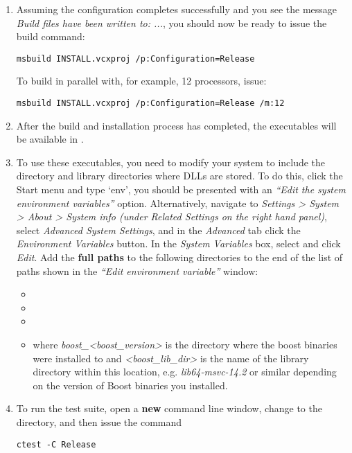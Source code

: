 \begin{enumerate}
  \item Assuming the configuration completes successfully and you see the message \emph{Build files have been written to: ...}, you should now be ready to issue the build command:
  \begin{lstlisting}[style=BashInputStyle]
    msbuild INSTALL.vcxproj /p:Configuration=Release
  \end{lstlisting}
  To build in parallel with, for example, 12 processors, issue:
  \begin{lstlisting}[style=BashInputStyle]
    msbuild INSTALL.vcxproj /p:Configuration=Release /m:12
  \end{lstlisting}
  \item After the build and installation process has completed, the executables will be
  available in .
  \item To use these executables, you need to modify your system  to
  include the  directory and library directories where DLLs are stored. To do this, click the
	Start menu and type `env', you should be presented with an \emph{``Edit the system environment variables''} 
	option. Alternatively, navigate to \emph{Settings > System > About > System info 
	(under Related Settings on the right hand panel)}, select
	\emph{Advanced System Settings}, and in the \emph{Advanced} tab click the
	\emph{Environment Variables} button. In the \emph{System Variables} box, select  and click
  \emph{Edit}. Add the \textbf{full paths} to the following directories to the end of the list of paths shown in the \emph{``Edit environment variable''} window:
  \begin{itemize}
    \item {}
    \item {}
    \item {}
    \item {} 
    where \emph{boost\_<boost\_version>} is the directory where the boost binaries were installed to and 
    \emph{<boost\_lib\_dir>} is the name of the library directory within this location, e.g. 
    \emph{lib64-msvc-14.2} or similar depending on the version of Boost binaries you installed.
  \end{itemize}
  \item To run the test suite, open a \textbf{new} command line window, change
  to the  directory, and then issue the command
  \begin{lstlisting}[style=BashInputStyle]
    ctest -C Release
  \end{lstlisting}
\end{enumerate}

